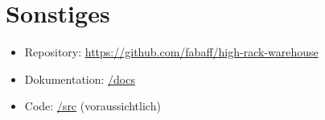 \documentclass[11pt,a4paper]{article}
\begin{document}
\section{Sonstiges}
\begin{itemize}
  \item Repository: \href{https://github.com/fabaff/high-rack-warehouse}{https://github.com/fabaff/high-rack-warehouse}
  \item Dokumentation: \href{https://github.com/fabaff/high-rack-warehouse/tree/master/docs}{/docs}
  \item Code: \href{https://github.com/fabaff/high-rack-warehouse/}{/src} (voraussichtlich)
\end{itemize}
\end{document}
